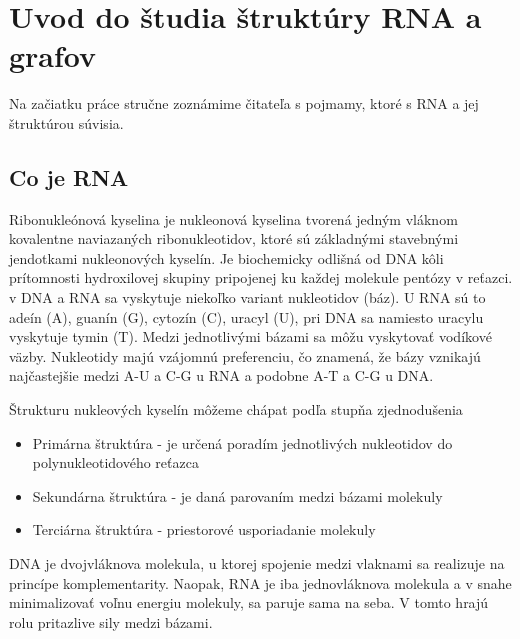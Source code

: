 \renewcommand{\SS}{\mathbb{S}}
\newcommand{\Par}[2]{\mbox{$( #1, #2 )$}}
\usetikzlibrary{positioning, shapes, trees, graphs} %
\newcommand{\scale}{0.6}

\newcommand{\tree}[1]{\ensuremath{#1}}

\chapter{Uvod do študia štruktúry RNA a grafov}
Na začiatku práce stručne zoznámime čitateľa s pojmamy, ktoré s RNA a jej štruktúrou súvisia.


\section{Co je RNA}

 
 Ribonukleónová kyselina je nukleonová kyselina tvorená jedným vláknom kovalentne naviazaných ribonukleotidov, 
 ktoré sú základnými stavebnými jendotkami nukleonových kyselín. Je biochemicky odlišná od DNA kôli prítomnosti 
 hydroxilovej skupiny pripojenej ku každej molekule pentózy v reťazci.
 v DNA a RNA sa vyskytuje niekoľko variant nukleotidov (báz). U RNA sú to
adeín (A), guanín (G), cytozín (C), uracyl (U),
pri DNA sa namiesto uracylu vyskytuje tymin (T).
Medzi jednotlivými bázami sa môžu vyskytovať vodíkové väzby. Nukleotidy majú
vzájomnú preferenciu, čo znamená, že bázy vznikajú najčastejšie medzi A-U a C-G
u RNA a podobne A-T a C-G u DNA.

Štrukturu nukleových kyselín môžeme chápat podľa stupňa zjednodušenia
\begin{itemize}
  \item Primárna štruktúra - je určená poradím jednotlivých nukleotidov
    do polynukleotidového reťazca
  \item Sekundárna štruktúra - je daná parovaním medzi bázami molekuly
  \item Terciárna štruktúra - priestorové usporiadanie molekuly
\end{itemize}
DNA je dvojvláknova molekula, u ktorej spojenie medzi vlaknami sa realizuje na princípe
komplementarity.
Naopak, RNA je iba jednovláknova molekula a v snahe minimalizovať voľnu energiu molekuly,
sa paruje sama na seba. V tomto hrajú rolu pritazlive sily medzi bázami.

